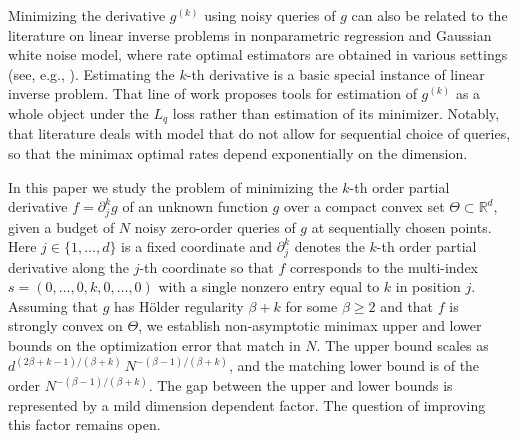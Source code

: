 \documentclass{article}
\renewcommand{\ge}{\geqslant}
\theoremstyle{definition}
\begin{document}
Minimizing the derivative $g^{(k)}$ using noisy queries of $g$ can also be related to the literature on linear inverse problems in nonparametric regression and Gaussian white noise model, where rate optimal estimators are obtained in various settings (see, e.g., \cite{bissantz2008statistical,cavalier2008nonparametric}). Estimating the $k$-th derivative is a basic special instance of linear inverse problem. That line of work proposes tools for estimation of $g^{(k)}$ as a whole object under the $L_q$ loss rather than estimation of its minimizer. Notably, that literature deals with model that do not allow for sequential choice of queries, so that the minimax optimal rates depend exponentially on the dimension.
 



In this paper we study the problem of minimizing the $k$-th order
partial derivative $f=\partial_j^k g$ of an unknown function
$g$ over a compact convex set $\Theta\subset\mathbb{R}^d$, given a
budget of $N$ noisy zero-order queries of $g$ at sequentially chosen
points. Here $j\in\{1,\dots,d\}$ is a fixed coordinate and
$\partial_j^k$ denotes the $k$-th order partial derivative along the
$j$-th coordinate so that $f$ corresponds to the multi-index
$s=(0,\dots,0,k,0,\dots,0)$ with a single nonzero entry equal to $k$
in position $j$.
Assuming that $g$ has H\"older regularity $\beta+k$ for some 
$\beta\ge 2$ and that $f$ is strongly convex on $\Theta$, we 
establish non-asymptotic minimax upper and lower bounds on the 
optimization error that match in $N$. The upper bound scales as 
$d^{(2\beta+k-1)/(\beta+k)}\,N^{-(\beta-1)/(\beta+k)}$, and the 
matching lower bound is of the order 
$N^{-(\beta-1)/(\beta+k)}$. The gap between the upper 
and lower bounds is represented by a mild dimension dependent factor. The question of improving this factor remains open.
\end{document}
